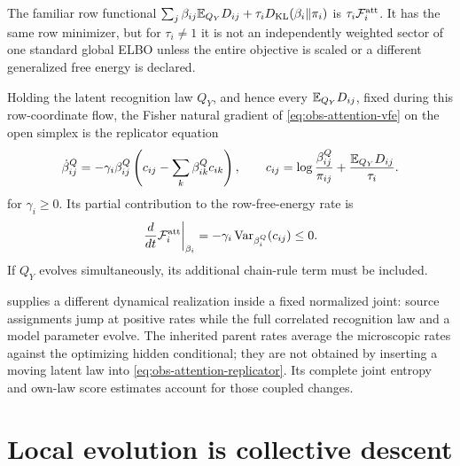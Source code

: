 The familiar row functional
$\sum_j\beta_{ij}\mathbb E_{Q_Y}D_{ij}+\tau_iD_{\mathrm{KL}}(\beta_i\Vert\pi_i)$ is
$\tau_i\mathcal F_i^{\rm att}$.  It has the same row minimizer, but for
$\tau_i\ne1$ it is not an independently weighted sector of one standard
global ELBO unless the entire objective is scaled or a different generalized
free energy is declared.  

Holding the latent recognition law $Q_Y$, and hence every
$\mathbb E_{Q_Y}D_{ij}$, fixed
during this row-coordinate flow, the Fisher natural gradient of
\eqref{eq:obs-attention-vfe} on the open simplex is the replicator equation
\begin{equation}
\dot\beta^Q_{ij}
=-\gamma_i\beta^Q_{ij}
\left(c_{ij}-\sum_k\beta^Q_{ik}c_{ik}\right),
\qquad
c_{ij}=\log\frac{\beta^Q_{ij}}{\pi_{ij}}
+\frac{\mathbb E_{Q_Y}D_{ij}}{\tau_i}.
\label{eq:obs-attention-replicator}
\end{equation}
for $\gamma_i\geq0$.  Its partial contribution to the row-free-energy rate is
\begin{equation}
\left.\frac{d}{dt}\mathcal F_i^{\rm att}\right|_{\beta_i}
=-\gamma_i\operatorname{Var}_{\beta^Q_i}(c_{ij})\leq0.
\label{eq:obs-attention-dissipation}
\end{equation}
If $Q_Y$ evolves simultaneously, its additional chain-rule term must be
included.  

 supplies a different dynamical realization
inside a fixed normalized joint: source assignments jump at positive rates
while the full correlated recognition law and a model parameter evolve.
The inherited parent rates average the microscopic rates against the
optimizing hidden conditional; they are not obtained by inserting a moving
latent law into \eqref{eq:obs-attention-replicator}. Its complete joint
entropy and own-law score estimates account for those coupled changes.

\section{Local evolution is collective descent}
\label{sec:local-natural-gradient}

